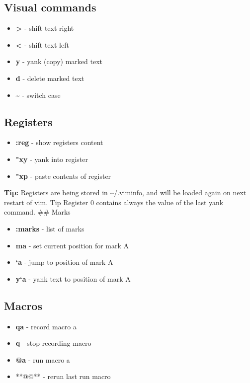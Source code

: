 \documentclass[twocolumn]{article}
\providecommand{\tightlist}{%
  \setlength{\itemsep}{0pt}\setlength{\parskip}{0pt}}
\begin{document}
\hypertarget{visual-commands}{%
\subsection{Visual commands}\label{visual-commands}}

\begin{itemize}
\tightlist
\item
  \textbf{\textgreater{}} - shift text right
\item
  \textbf{\textless{}} - shift text left
\item
  \textbf{y} - yank (copy) marked text
\item
  \textbf{d} - delete marked text
\item
  \textbf{\textasciitilde{}} - switch case
\end{itemize}

\hypertarget{registers}{%
\subsection{Registers}\label{registers}}

\begin{itemize}
\tightlist
\item
  \textbf{:reg} - show registers content
\item
  \textbf{"xy} - yank into register
\item
  \textbf{"xp} - paste contents of register
\end{itemize}

\textbf{Tip:} Registers are being stored in \textasciitilde/.viminfo,
and will be loaded again on next restart of vim. Tip Register 0 contains
always the value of the last yank command. \#\# Marks

\begin{itemize}
\tightlist
\item
  \textbf{:marks} - list of marks
\item
  \textbf{ma} - set current position for mark A
\item
  \textbf{`a} - jump to position of mark A
\item
  \textbf{y`a} - yank text to position of mark A
\end{itemize}

\hypertarget{macros}{%
\subsection{Macros}\label{macros}}

\begin{itemize}
\tightlist
\item
  \textbf{qa} - record macro a
\item
  \textbf{q} - stop recording macro
\item
  \textbf{@a} - run macro a
\item
  **@@** - rerun last run macro
\end{itemize}
\end{document}
